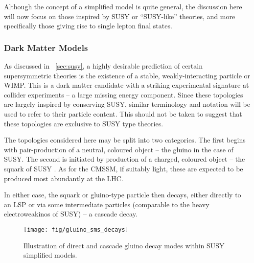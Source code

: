 Although the concept of a simplified model is quite general, the discussion here
will now focus on those inspired by \ac{SUSY} or ``\ac{SUSY}-like'' theories,
and more specifically those giving rise to single lepton final states.

\subsubsection{Dark Matter Models}
As discussed in \chap~\ref{sec:susy}, a highly desirable prediction of certain
supersymmetric theories is the existence of a stable, weakly-interacting
particle or \ac{WIMP}. This is a dark matter candidate with a striking
experimental signature at collider experiments -- a large missing energy
component. Since these topologies are largely inspired by \Rparity conserving
\ac{SUSY}, similar terminology and notation will be used to refer to their
particle content. This should not be taken to suggest that these topologies are
exclusive to \ac{SUSY} type theories.

The topologies considered here may be split into two categories. The first
begins with pair-production of a neutral, coloured object -- the gluino in the
case of \ac{SUSY}. The second is initiated by production of a charged, coloured
object -- the squark of \ac{SUSY} . As for the \ac{CMSSM}, if suitably light,
these are expected to be produced most abundantly at the \ac{LHC}.

In either case, the squark or gluino-type particle then decays, either directly
to an \ac{LSP} or via some intermediate particles (comparable to the heavy
electroweakinos of \ac{SUSY}) -- a cascade decay.

\begin{figure}[h!]
\texttt{[image: fig/gluino\_sms\_decays]}
\caption{Illustration of direct and cascade gluino decay modes within \ac{SUSY}
  simplified models.~\cite{alves_simplified_2011}}
\label{fig:gluino_sms_decays}
\end{figure}

